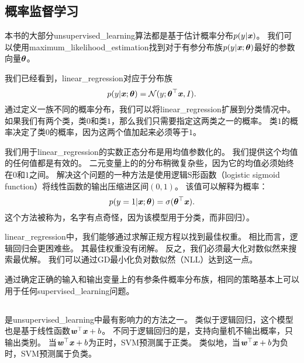 
\subsection{概率监督学习}
\label{sec:probabilistic_supervised_learning}
本书的大部分\gls{unsupervised_learning}算法都是基于估计概率分布$p(y|\boldsymbol{\mathit{x}})$。
我们可以使用\gls{maximum_likelihood_estimation}找到对于有参分布族$p(y|\boldsymbol{\mathit{x}};\boldsymbol{\theta})$最好的参数向量$\boldsymbol{\theta}$。 

我们已经看到，\gls{linear_regression}对应于分布族
\begin{equation}
    p(y | \boldsymbol{\mathit{x}}; \boldsymbol{\theta}) = \mathcal{N}( y; \boldsymbol{\theta}^\top \boldsymbol{\mathit{x}}, I).
\end{equation}
通过定义一族不同的概率分布，我们可以将\gls{linear_regression}扩展到分类情况中。
如果我们有两个类，类$0$和类$1$，那么我们只需要指定这两类之一的概率。
类$1$的概率决定了类$0$的概率，因为这两个值加起来必须等于$1$。

我们用于\gls{linear_regression}的实数正态分布是用均值参数化的。
我们提供这个均值的任何值都是有效的。
二元变量上的的分布稍微复杂些，因为它的均值必须始终在$0$和$1$之间。
解决这个问题的一种方法是使用逻辑S形函数（logistic sigmoid function）将线性函数的输出压缩进区间$(0,1)$。
该值可以解释为概率：
\begin{equation}
    p(y = 1 | \boldsymbol{\mathit{x}}; \boldsymbol{\theta}) = \sigma(\boldsymbol{\theta}^\top \boldsymbol{\mathit{x}}).
\end{equation}
这个方法被称为，名字有点奇怪，因为该模型用于分类，而非回归）。

\gls{linear_regression}中，我们能够通过求解正规方程以找到最佳权重。
相比而言，逻辑回归会更困难些。
其最佳权重没有闭解。
反之，我们必须最大化对数似然来搜索最优解。
我们可以通过\gls{GD}最小化负对数似然（NLL）达到这一点。

通过确定正确的输入和输出变量上的有参条件概率分布族，相同的策略基本上可以用于任何\gls{supervised_learning}问题。

\subsection{}
\label{sec:support_vector_machines}
是\gls{unsupervised_learning}中最有影响力的方法之一\citep{Boser92,Cortes95}。
类似于逻辑回归，这个模型也是基于线性函数$\boldsymbol{\mathit{w}}^\top \boldsymbol{\mathit{x}} + b$。
不同于逻辑回归的是，支持向量机不输出概率，只输出类别。
当$\boldsymbol{\mathit{w}}^\top\boldsymbol{\mathit{x}} + b$为正时，\gls{SVM}预测属于正类。
类似地，当$\boldsymbol{\mathit{w}}^\top\boldsymbol{\mathit{x}} + b$为负时，\gls{SVM}预测属于负类。


